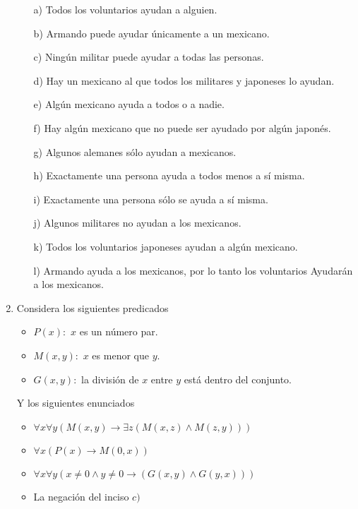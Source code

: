 \documentclass[letterpaper,11pt]{article}
\begin{document}
\begin{enumerate}
    \begin{itemize}
        \item[a)] Todos los voluntarios ayudan a alguien.
        \item[b)] Armando puede ayudar únicamente a un mexicano.
        \item[c)] Ningún militar puede ayudar a todas las personas.
        \item[d)] Hay un mexicano al que todos los militares y japoneses lo 
        ayudan.
        \item[e)] Algún mexicano ayuda a todos o a nadie.
        \item[f)] Hay algún mexicano que no puede ser ayudado por algún 
        japonés. 
        \item[g)] Algunos alemanes sólo ayudan a mexicanos.
        \item[h)] Exactamente una persona ayuda a todos menos a sí misma.
        \item[i)] Exactamente una persona sólo se ayuda a sí misma.
        \item[j)] Algunos militares no ayudan a los mexicanos.
        \item[k)] Todos los voluntarios japoneses ayudan a algún mexicano. 
        \item[l)] Armando ayuda a los mexicanos, por lo tanto los voluntarios
        Ayudarán a los mexicanos. 
    \end{itemize}

    \item Considera los siguientes predicados 

    \begin{itemize}
        \item $P(x):$ $x$ es un número par.
        \item $M(x, y):$ $x$ es menor que $y$.
        \item $G(x, y):$ la división de $x$ entre $y$ está dentro del conjunto.
    \end{itemize}

    Y los siguientes enunciados

    \begin{itemize}
        \item $∀x ∀y (M(x, y) → ∃z(M(x, z) \land M(z, y)))$
        \item $∀x (P(x) → M(0, x))$
        \item $∀x ∀y (x \neq 0 \land y \neq 0 → (G(x, y) \land G(y, x)))$
        \item La negación del inciso $c)$         
    \end{itemize}


\end{enumerate}
\end{document}
